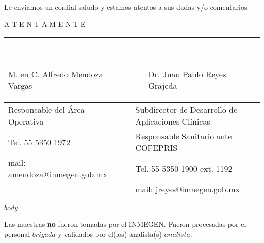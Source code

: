 \documentclass{article}
\begin{document}
\smallskip

Le enviamos un cordial saludo y estamos atentos a sus dudas y/o comentarios.\\

\medskip

\vspace*{\fill}
\begin{center}
A T E N T A M E N T E
\end{center}

\vspace{2cm}
\begin{center}
\begin{tabular}{m{8cm} p{1cm} m{8cm}}
~ & ~ & ~ \\
~ & ~ & ~ \\
\cmidrule(r){1-1}\cmidrule(l){3-3}
M. en C. Alfredo Mendoza Vargas & ~ & Dr. Juan Pablo Reyes Grajeda \\
\end{tabular}

\footnotesize
\begin{tabular}{m{8cm} p{1cm} m{8cm}}
Responsable del Área Operativa & ~ & Subdirector de Desarrollo de Aplicaciones Clínicas\\
Tel. 55 5350 1972 & ~ & Responsable Sanitario ante COFEPRIS\\
mail: amendoza@inmegen.gob.mx & ~ & Tel. 55 5350 1900 ext. 1192\\
~ & ~ & mail: jreyes@inmegen.gob.mx \\
\end{tabular}
\end{center}

\clearpage

$body$


\vspace*{\fill}
{\footnotesize Las muestras \textbf{no} fueron tomadas por el INMEGEN. Fueron procesadas por el personal $brigada$ y validados por el(los) analista(s) $analista$. \par}
\end{document}
